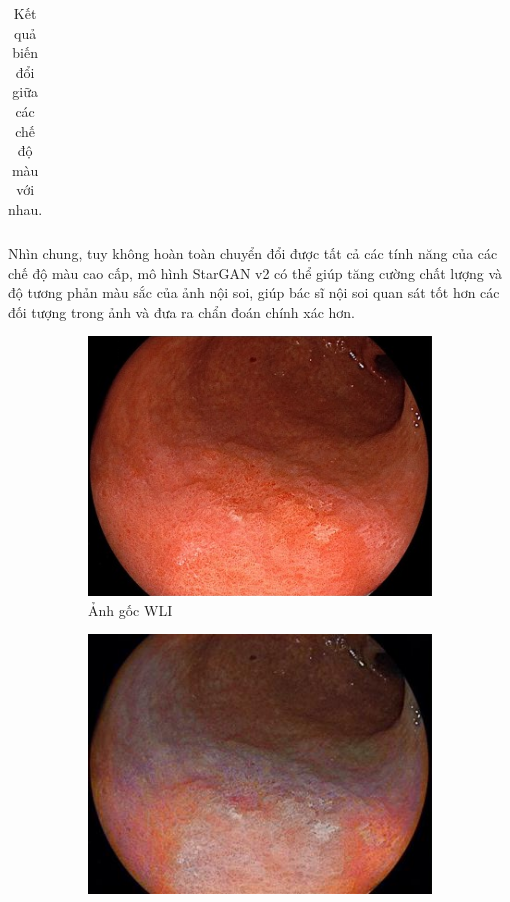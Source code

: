 \documentclass[12pt]{extreport}
\begin{document}
\begin{table}[H]
\begin{tabular}{c | c | c | c | c}
    \end{tabular}
    \caption{Kết quả biến đổi giữa các chế độ màu với nhau.}
\end{table}

Nhìn chung, tuy không hoàn toàn chuyển đổi được tất cả các tính năng của các chế độ màu cao cấp, mô hình StarGAN v2 có thể giúp tăng cường chất lượng và độ tương phản màu sắc của ảnh nội soi, giúp bác sĩ nội soi quan sát tốt hơn các đối tượng trong ảnh và đưa ra chẩn đoán chính xác hơn.

\begin{figure}[H]
    \centering
    \begin{subfigure}[H]{0.32\textwidth}
        \centering
        \includegraphics[width=\linewidth]{example/wli.png}
        \caption{Ảnh gốc WLI}
    \end{subfigure}
    \begin{subfigure}[H]{0.32\textwidth}
        \centering
        \includegraphics[width=\linewidth]{example/lci.jpeg}

\end{subfigure}
\end{figure}
\end{document}
